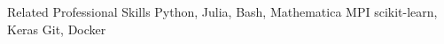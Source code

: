 \begin{rubric}{Related Professional Skills}
	Python, Julia, Bash, Mathematica
	MPI
	scikit-learn, Keras
	Git, Docker
\end{rubric}